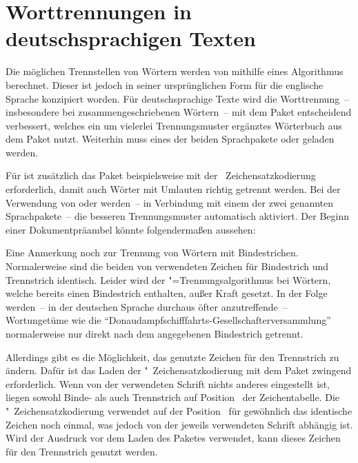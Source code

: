 \section{%
  Worttrennungen in deutschsprachigen Texten%
  \label{sec:tips:hyphenation}%
}

%
Die möglichen Trennstellen von Wörtern werden von  mithilfe 
eines Algorithmus berechnet. Dieser ist jedoch in seiner ursprünglichen Form 
für die englische Sprache konzipiert worden. Für deutschsprachige Texte wird 
die Worttrennung~-- insbesondere bei zusammengeschriebenen Wörtern~-- mit dem 
Paket  entscheidend verbessert, welches ein um vielerlei 
Trennungsmuster ergänztes Wörterbuch aus dem Paket  
nutzt. Weiterhin muss eines der beiden Sprachpakete  oder
 geladen werden. 

Für  ist zusätzlich das Paket  beispielsweise 
mit der ~Zeichensatzkodierung erforderlich, damit auch Wörter mit 
Umlauten richtig getrennt werden. Bei der Verwendung von  
oder  werden~-- in Verbindung mit einem der zwei genannten 
Sprachpakete~-- die besseren Trennungsmuster automatisch aktiviert. Der Beginn 
einer Dokumentpräambel könnte folgendermaßen aussehen:
%
\begin{quoting}[rightmargin=0pt]
\end{quoting}
%
Eine Anmerkung noch zur Trennung von Wörtern mit Bindestrichen. Normalerweise 
sind die beiden von  verwendeten Zeichen für Bindestrich und 
Trennstrich identisch. Leider wird der "=Trennungsalgorithmus 
bei Wörtern, welche bereits einen Bindestrich enthalten, außer Kraft gesetzt. 
In der Folge werden~-- in der deutschen Sprache durchaus öfter anzutreffende~-- 
Wortungetüme wie die \enquote{Donaudampfschifffahrts-Gesellschafterversammlung} 
normalerweise nur direkt nach dem angegebenen Bindestrich getrennt. 

Allerdings gibt es die Möglichkeit, das genutzte Zeichen für den Trennstrich 
zu ändern. Dafür ist das Laden der "~Zeichensatzkodierung mit dem 
Paket  zwingend erforderlich. Wenn von der verwendeten Schrift 
nichts anderes eingestellt ist, liegen sowohl Binde- als auch Trennstrich auf 
Position~ der Zeichentabelle. Die "~Zeichensatzkodierung 
verwendet auf der Position~ für gewöhnlich das identische Zeichen 
noch einmal, was jedoch von der jeweils verwendeten Schrift abhängig ist. Wird 
der Ausdruck  vor dem Laden des Paketes 
 verwendet, kann dieses Zeichen für den Trennstrich genutzt 
werden. 

